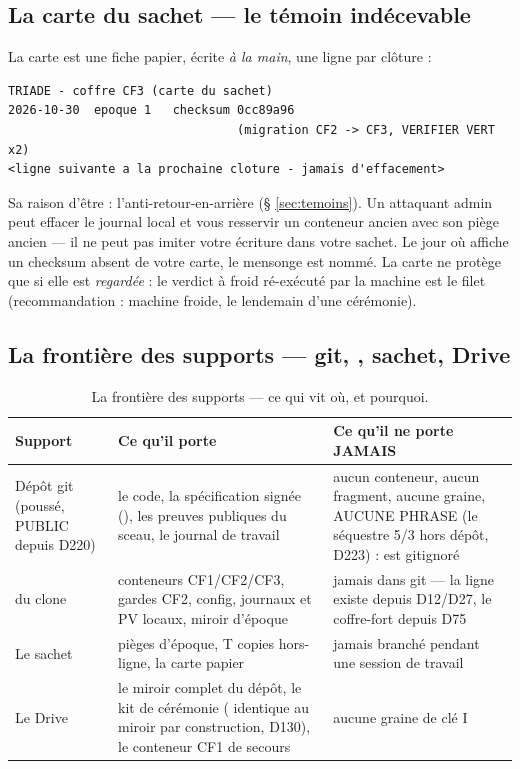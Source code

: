 \subsection{La carte du sachet — le témoin indécevable}

La carte est une fiche papier, écrite \emph{à la main}, une ligne par clôture :

\begin{lstlisting}
TRIADE - coffre CF3 (carte du sachet)
2026-10-30  epoque 1   checksum 0cc89a96
                                (migration CF2 -> CF3, VERIFIER VERT x2)
<ligne suivante a la prochaine cloture - jamais d'effacement>
\end{lstlisting}

Sa raison d'être : l'anti-retour-en-arrière (§ \ref{sec:temoins}). Un attaquant admin
peut effacer le journal local et vous resservir un conteneur ancien avec son piège
ancien — il ne peut pas imiter votre écriture dans votre sachet. Le jour où
 affiche un checksum absent de votre carte, le mensonge est nommé.
La carte ne protège que si elle est \emph{regardée} : le verdict à froid ré-exécuté
par la machine est le filet (recommandation : machine froide, le lendemain d'une
cérémonie).

\subsection{La frontière des supports — git, , sachet, Drive}

\begin{table}[htbp]
\centering\small
\caption{La frontière des supports — ce qui vit où, et pourquoi.}
\label{tab:frontiere}
\begin{tabularx}{\textwidth}{@{}l Y Y@{}}
\toprule
\textbf{Support} & \textbf{Ce qu'il porte} & \textbf{Ce qu'il ne porte JAMAIS} \\
\midrule
Dépôt git (poussé, PUBLIC depuis D220) & le code, la spécification signée
(), les preuves publiques du sceau, le journal de travail & aucun
conteneur, aucun fragment, aucune graine, AUCUNE PHRASE (le séquestre 5/3
hors dépôt, D223) :  est gitignoré \\
 du clone & conteneurs CF1/CF2/CF3, gardes CF2, config, journaux et PV
locaux, miroir d'époque & jamais dans git — la ligne existe depuis D12/D27, le
coffre-fort depuis D75 \\
Le sachet & pièges d'époque, T copies hors-ligne, la carte papier & jamais branché
pendant une session de travail \\
Le Drive & le miroir complet du dépôt, le kit de cérémonie ( identique au
miroir par construction, D130), le conteneur CF1 de secours & aucune graine de clé I \\
\bottomrule
\end{tabularx}
\end{table}

